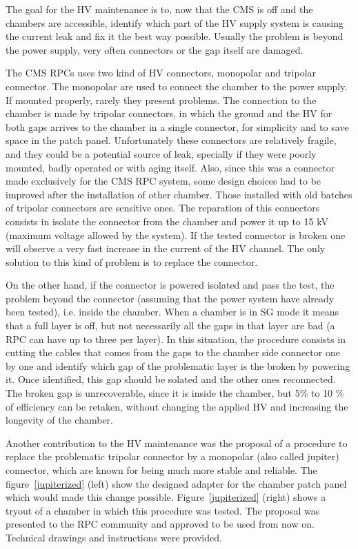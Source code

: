 The goal for the HV maintenance is to, now that the CMS is off and the chambers are accessible, identify which part of the HV supply system is causing the current leak and fix it the best way possible. Usually the problem is beyond the power supply, very often connectors or the gap itself are damaged.

The CMS RPCs uses two kind of HV connectors, monopolar and tripolar connector. The monopolar are used to connect the chamber to the power supply. If mounted properly, rarely they present problems. The connection to the chamber is made by tripolar connectors, in which the ground and the HV for both gaps arrives to the chamber in a single connector, for simplicity and to save space in the patch panel. Unfortunately these connectors are relatively fragile, and they could be a potential source of leak, specially if they were poorly mounted, badly operated or with aging itself. Also, since this was a connector made exclusively for the CMS RPC system, some design choices had to be improved after the installation of other chamber. Those installed with old batches of tripolar connectors are sensitive ones. The reparation of this connectors consists in isolate the connector from the chamber and power it up to 15 kV (maximum voltage allowed by the system). If the tested connector is broken one will observe a very fast increase in the current of the HV channel. The only solution to this kind of problem is to replace the connector.

On the other hand, if the connector is powered isolated and pass the test, the problem beyond the connector (assuming that the power system have already been tested), i.e. inside the chamber. When a chamber is in SG mode it means that a full layer is off, but not necessarily all the gaps in that layer are bad (a RPC can have up to three per layer). In this situation, the procedure consists in cutting the cables that comes from the gaps to the chamber side connector one by one and identify which gap of the problematic layer is the broken by powering it. Once identified, this gap should be solated and the other ones reconnected. The broken gap is unrecoverable, since it is inside the chamber, but 5\% to 10 \% of efficiency can be retaken, without changing the applied HV and increasing the longevity of the chamber.

Another contribution to the HV maintenance was the proposal of a procedure to replace the problematic tripolar connector by a monopolar (also called jupiter) connector, which are known for being much more stable and reliable. The figure~\ref{jupiterized} (left) show the designed adapter for the chamber patch panel which would made this change possible. Figure~\ref{jupiterized} (right) shows a tryout of a chamber in which this procedure was tested. The proposal was presented to the RPC community and approved to be used from now on. Technical drawings and instructions were provided.

